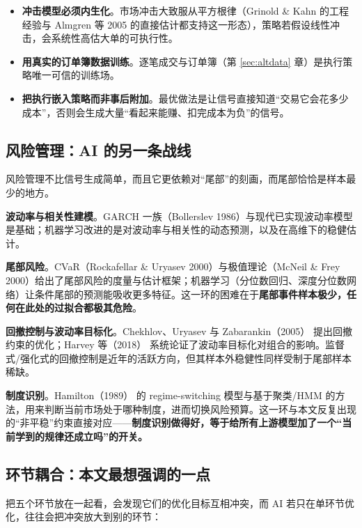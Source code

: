 \begin{itemize}
  \item \textbf{冲击模型必须内生化}。市场冲击大致服从平方根律（Grinold \& Kahn 的工程经验与 Almgren 等 2005\cite{almgren2005} 的直接估计都支持这一形态），策略若假设线性冲击，会系统性高估大单的可执行性。
  \item \textbf{用真实的订单簿数据训练}。逐笔成交与订单簿（第 \ref{sec:altdata} 章）是执行策略唯一可信的训练场。
  \item \textbf{把执行嵌入策略而非事后附加}。最优做法是让信号直接知道“交易它会花多少成本”，否则会生成大量“看起来能赚、扣完成本为负”的信号。
\end{itemize}

\subsection{风险管理：AI 的另一条战线}

风险管理不比信号生成简单，而且它更依赖对“尾部”的刻画，而尾部恰恰是样本最少的地方。

\textbf{波动率与相关性建模}。GARCH 一族（Bollerslev 1986\cite{bollerslev1986}）与现代已实现波动率模型是基础；机器学习改进的是对波动率与相关性的动态预测，以及在高维下的稳健估计。

\textbf{尾部风险}。CVaR（Rockafellar \& Uryasev 2000\cite{rockafellar2000}）与极值理论（McNeil \& Frey 2000\cite{mcneil2000}）给出了尾部风险的度量与估计框架；机器学习（分位数回归、深度分位数网络）让条件尾部的预测能吸收更多特征。这一环的困难在于\textbf{尾部事件样本极少，任何在此处的过拟合都极其危险}。

\textbf{回撤控制与波动率目标化}。Chekhlov、Uryasev 与 Zabarankin（2005）\cite{chekhlov2005} 提出回撤约束的优化；Harvey 等（2018）\cite{harvey2018} 系统论证了波动率目标化对组合的影响。监督式/强化式的回撤控制是近年的活跃方向，但其样本外稳健性同样受制于尾部样本稀缺。

\textbf{制度识别}。Hamilton（1989）\cite{hamilton1989} 的 regime-switching 模型与基于聚类/HMM 的方法，用来判断当前市场处于哪种制度，进而切换风险预算。这一环与本文反复出现的“非平稳”约束直接对应——\textbf{制度识别做得好，等于给所有上游模型加了一个“当前学到的规律还成立吗”的开关。}

\subsection{环节耦合：本文最想强调的一点}

把五个环节放在一起看，会发现它们的优化目标互相冲突，而 AI 若只在单环节优化，往往会把冲突放大到别的环节：

